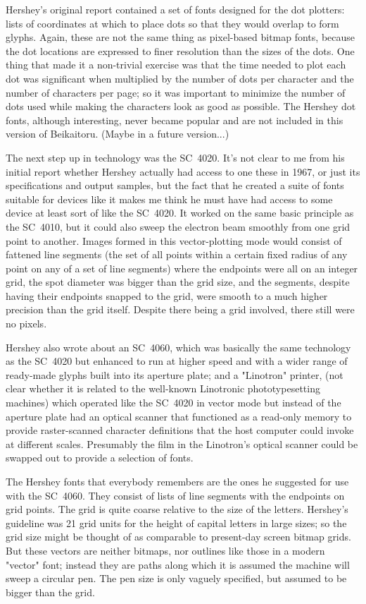 \documentclass{article}
\begin{document}
Hershey's original report contained a set of fonts designed for the dot
plotters:  lists of coordinates at which to place dots so that they would
overlap to form glyphs.  Again, these are not the same thing as
pixel-based bitmap fonts, because the dot locations are expressed to finer
resolution than the sizes of the dots.  One thing that made it a non-trivial
exercise was that the time needed to plot each dot was significant when
multiplied by the number of dots per character and the number of characters
per page; so it was important to minimize the number of dots used while
making the characters look as good as possible.  The Hershey dot fonts,
although interesting, never became popular and are not included in this
version of Beikaitoru.  (Maybe in a future version...)

The next step up in technology was the SC~4020.  It's not clear to me from
his initial report whether Hershey actually had access to one these in 1967,
or just its specifications and output samples, but the fact that he created
a suite of fonts suitable for devices like it makes me think he must have
had access to some device at least sort of like the SC~4020.  It worked on
the same basic principle as the SC~4010, but it could also sweep the
electron beam smoothly from one grid point to another.  Images formed in
this vector-plotting mode would consist of fattened line segments (the set
of all points within a certain fixed radius of any point on any of a set of
line segments) where the endpoints were all on an integer grid, the spot
diameter was bigger than the grid size, and the segments, despite having
their endpoints snapped to the grid, were smooth to a much higher precision
than the grid itself.  Despite there being a grid involved, there still were
no pixels.

Hershey also wrote about an SC~4060, which was basically the same technology
as the SC~4020 but enhanced to run at higher speed and with a wider range of
ready-made glyphs built into its aperture plate; and a "Linotron" printer,
(not clear whether it is related to the well-known Linotronic
phototypesetting machines) which operated like the SC~4020 in vector mode
but instead of the aperture plate had an optical scanner that functioned as
a read-only memory to provide raster-scanned character definitions that the
host computer could invoke at different scales.  Presumably the film in the
Linotron's optical scanner could be swapped out to provide a selection of
fonts.

The Hershey fonts that everybody remembers are the ones he suggested for use
with the SC~4060.  They consist of lists of line segments with the endpoints
on grid points.  The grid is quite coarse relative to the size of the
letters.  Hershey's guideline was 21 grid units for the height of capital
letters in large sizes; so the grid size might be thought of as comparable
to present-day screen bitmap grids.  But these vectors are neither bitmaps,
nor outlines like those in a modern "vector" font; instead they are paths
along which it is assumed the machine will sweep a circular pen.  The pen
size is only vaguely specified, but assumed to be bigger than the grid.
\end{document}
